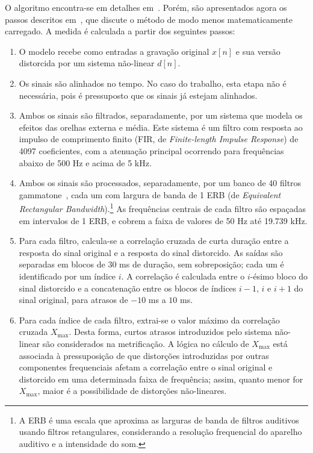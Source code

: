 O algoritmo encontra-se em detalhes em~\cite{tan-2004}. Porém, são apresentados agora os passos descritos em~\cite{moore-2004}, que discute o método de modo menos matematicamente carregado. A medida é calculada a partir dos seguintes passos:

\begin{enumerate}
    \item O modelo recebe como entradas a gravação original $x[n]$ e sua versão distorcida por um sistema não-linear $d[n]$.

    \item Os sinais são alinhados no tempo. No caso do trabalho, esta etapa não é necessária, pois é pressuposto que os sinais já estejam alinhados.

    \item Ambos os sinais são filtrados, separadamente, por um sistema que modela os efeitos das orelhas externa e média. Este sistema é um filtro com resposta ao impulso de comprimento finito (FIR, de \textit{Finite-length Impulse Response}) de 4097 coeficientes, com a atenuação principal ocorrendo para frequências abaixo de 500 Hz e acima de 5 kHz.
    
    \item Ambos os sinais são processados, separadamente, por um banco de 40 filtros gammatone~\cite{slaney-1993}, cada um com largura de banda de 1 ERB (de \textit{Equivalent Rectangular Bandwidth}).\footnote{A ERB é uma escala que aproxima as larguras de banda de filtros auditivos usando filtros retangulares, considerando a resolução frequencial do aparelho auditivo e a intensidade do som.} As frequências centrais de cada filtro são espaçadas em intervalos de 1 ERB, e cobrem a faixa de valores de 50 Hz até 19.739 kHz.
    
    \item Para cada filtro, calcula-se a correlação cruzada de curta duração entre a resposta do sinal original e a resposta do sinal distorcido. As saídas são separadas em blocos de 30 ms de duração, sem sobreposição; cada um é identificado por um índice $i$. A correlação é calculada entre o $i$-ésimo bloco do sinal distorcido e a concatenação entre os blocos de índices $i-1$, $i$ e $i+1$ do sinal original, para atrasos de $-10$ ms a $10$ ms.
    
    \item Para cada índice de cada filtro, extrai-se o valor máximo da correlação cruzada $X_{\max}$. Desta forma, curtos atrasos introduzidos pelo sistema não-linear são considerados na metrificação. A lógica no cálculo de $X_{\max}$ está associada à pressuposição de que distorções introduzidas por outras componentes frequenciais afetam a correlação entre o sinal original e distorcido em uma determinada faixa de frequência; assim, quanto menor for $X_{\max}$, maior é a possibilidade de distorções não-lineares.
    

\end{enumerate}
